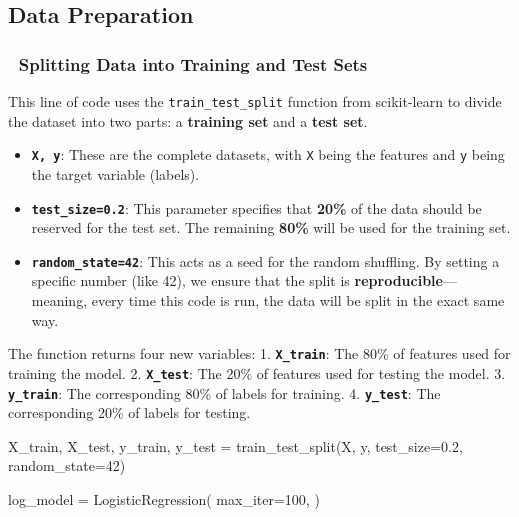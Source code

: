 \documentclass[
  letterpaper,
  DIV=11,
  numbers=noendperiod]{scrartcl}
\newenvironment{Shaded}{\begin{snugshade}}{\end{snugshade}}
\newcommand{\DecValTok}[1]{\textcolor[rgb]{0.68,0.00,0.00}{#1}}
\newcommand{\FloatTok}[1]{\textcolor[rgb]{0.68,0.00,0.00}{#1}}
\newcommand{\NormalTok}[1]{\textcolor[rgb]{0.00,0.23,0.31}{#1}}
\newcommand{\OperatorTok}[1]{\textcolor[rgb]{0.37,0.37,0.37}{#1}}
\providecommand{\tightlist}{%
  \setlength{\itemsep}{0pt}\setlength{\parskip}{0pt}}
\begin{document}
\subsection{Data Preparation}\label{data-preparation}

\subsubsection{🔪 Splitting Data into Training and Test
Sets}\label{splitting-data-into-training-and-test-sets}

This line of code uses the \texttt{train\_test\_split} function from
scikit-learn to divide the dataset into two parts: a \textbf{training
set} and a \textbf{test set}.

\begin{itemize}
\tightlist
\item
  \textbf{\texttt{X,\ y}}: These are the complete datasets, with
  \texttt{X} being the features and \texttt{y} being the target variable
  (labels).
\item
  \textbf{\texttt{test\_size=0.2}}: This parameter specifies that
  \textbf{20\%} of the data should be reserved for the test set. The
  remaining \textbf{80\%} will be used for the training set.
\item
  \textbf{\texttt{random\_state=42}}: This acts as a seed for the random
  shuffling. By setting a specific number (like 42), we ensure that the
  split is \textbf{reproducible}---meaning, every time this code is run,
  the data will be split in the exact same way.
\end{itemize}

The function returns four new variables: 1. \textbf{\texttt{X\_train}}:
The 80\% of features used for training the model. 2.
\textbf{\texttt{X\_test}}: The 20\% of features used for testing the
model. 3. \textbf{\texttt{y\_train}}: The corresponding 80\% of labels
for training. 4. \textbf{\texttt{y\_test}}: The corresponding 20\% of
labels for testing.

\begin{Shaded}
\begin{Highlighting}[]
\NormalTok{X\_train, X\_test, y\_train, y\_test }\OperatorTok{=}\NormalTok{ train\_test\_split(X, y, test\_size}\OperatorTok{=}\FloatTok{0.2}\NormalTok{, random\_state}\OperatorTok{=}\DecValTok{42}\NormalTok{)}
\end{Highlighting}
\end{Shaded}

\begin{Shaded}
\begin{Highlighting}[]
\NormalTok{log\_model }\OperatorTok{=}\NormalTok{ LogisticRegression(}
\NormalTok{    max\_iter}\OperatorTok{=}\DecValTok{100}\NormalTok{,}
\NormalTok{)}
\end{Highlighting}
\end{Shaded}
\end{document}
